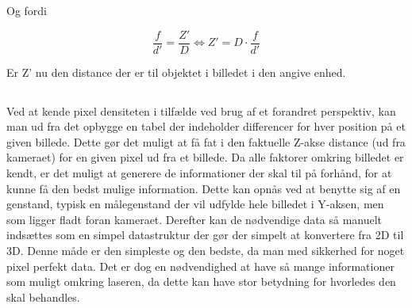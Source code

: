 Og fordi

\begin{equation}
    \frac{f}{d'} = \frac{Z'}{D} \Leftrightarrow Z' = D \cdot \frac{f}{d'}
\end{equation}

Er Z' nu den distance der er til objektet i billedet i den angive enhed.

\subsection{}
Ved at kende pixel densiteten i tilfælde ved brug af et forandret perspektiv, kan man ud fra det opbygge en tabel der indeholder differencer for hver position på et given billede. Dette gør det muligt at få fat i den faktuelle Z-akse distance (ud fra kameraet) for en given pixel ud fra et billede. Da alle faktorer omkring billedet er kendt, er det muligt at generere de informationer der skal til på forhånd, for at kunne få den bedst mulige information. Dette kan opnås ved at benytte sig af en genstand, typisk en målegenstand der vil udfylde hele billedet i Y-aksen, men som ligger fladt foran kameraet.
Derefter kan de nødvendige data så manuelt indsættes som en simpel datastruktur der gør der simpelt at konvertere fra 2D til 3D. Denne måde er den simpleste og den bedste, da man med sikkerhed for noget pixel perfekt data. Det er dog en nødvendighed at have så mange informationer som muligt omkring laseren, da dette kan have stor betydning for hvorledes den skal behandles.
